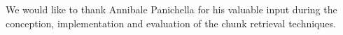 \begin{acknowledgements}
We would like to thank Annibale Panichella for his valuable input during the conception, implementation and evaluation of the chunk retrieval techniques.
\end{acknowledgements}


%
%







